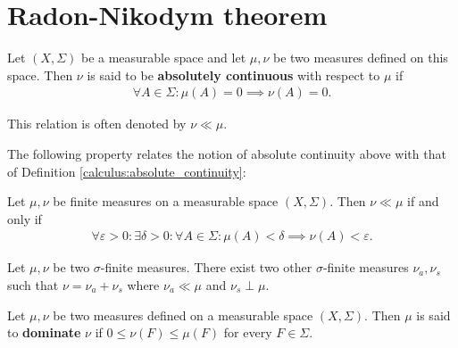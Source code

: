 \section{Radon-Nikodym theorem}\label{lebesgue:section:Radon-Nikodym}

    \begin{definition}\label{lebesgue:absolute_continuity}
        Let $(X,\Sigma)$ be a measurable space and let $\mu, \nu$ be two measures defined on this space. Then $\nu$ is said to be \textbf{absolutely continuous} with respect to $\mu$ if
        \begin{gather}
            \forall A\in\Sigma: \mu(A) = 0\implies\nu(A) = 0.
        \end{gather}
    \end{definition}
    \begin{notation}
        This relation is often denoted by $\nu\ll\mu$.
    \end{notation}

    The following property relates the notion of absolute continuity above with that of Definition \ref{calculus:absolute_continuity}:
    \begin{property}
        Let $\mu, \nu$ be finite measures on a measurable space $(X, \Sigma)$. Then $\nu\ll\mu$ if and only if
        \begin{gather}
            \forall\varepsilon>0:\exists\delta>0:\forall A\in\Sigma:\mu(A)<\delta\implies\nu(A)<\varepsilon.
        \end{gather}
    \end{property}

    \begin{theorem}
        Let $\mu,\nu$ be two $\sigma$-finite measures. There exist two other $\sigma$-finite measures $\nu_a,\nu_s$ such that $\nu=\nu_a+\nu_s$ where $\nu_a\ll\mu$ and $\nu_s\perp\mu$.
    \end{theorem}

    \begin{definition}
            Let $\mu, \nu$ be two measures defined on a measurable space $(X, \Sigma)$. Then $\mu$ is said to \textbf{dominate} $\nu$ if $0\leq\nu(F)\leq\mu(F)$ for every $F\in\Sigma$.
    \end{definition}

